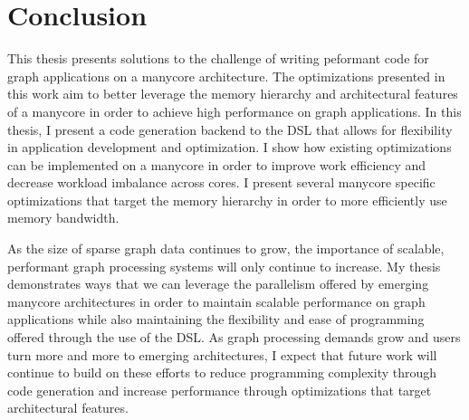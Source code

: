 \chapter{Conclusion}\label{gen:sec:conclusion}

This thesis presents solutions to the challenge of writing peformant code for graph applications on a manycore architecture. 
The optimizations presented in this work aim to better leverage the memory hierarchy and architectural features of a manycore in order to achieve high performance on graph applications. 
In this thesis, I present a code generation backend to the \graphit DSL that allows for flexibility in application development and optimization. 
I show how existing optimizations can be implemented on a manycore in order to improve work efficiency and decrease workload imbalance across cores. 
I present several manycore specific optimizations that target the memory hierarchy in order to more efficiently use memory bandwidth.

As the size of sparse graph data continues to grow, the importance of scalable, performant graph processing systems will only continue to increase. 
My thesis demonstrates ways that we can leverage the parallelism offered by emerging manycore architectures in order to maintain scalable performance on graph applications while also maintaining the flexibility and ease of programming offered through the use of the \graphit DSL. 
As graph processing demands grow and users turn more and more to emerging architectures, I expect that future work will continue to build on these efforts to reduce programming complexity through code generation and increase performance through optimizations that target architectural features. 



